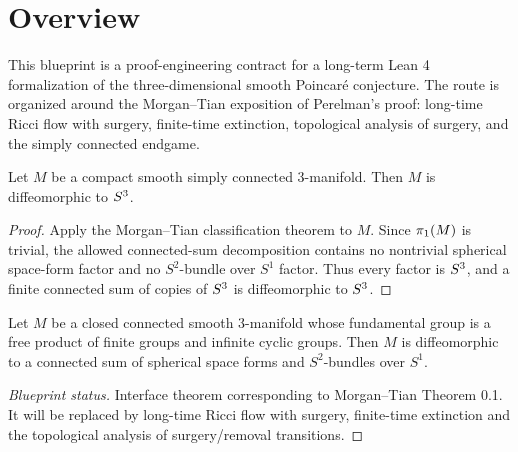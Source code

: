 \chapter{Overview}

This blueprint is a proof-engineering contract for a long-term Lean 4
formalization of the three-dimensional smooth Poincar\'e conjecture. The route is
organized around the Morgan--Tian exposition of Perelman's proof: long-time Ricci
flow with surgery, finite-time extinction, topological analysis of surgery, and
the simply connected endgame.

\begin{theorem}
  \label{thm:poincare-three-smooth}
  \notready
  Let $M$ be a compact smooth simply connected 3-manifold. Then $M$ is
  diffeomorphic to $S^3$.
\end{theorem}

\begin{proof}
  Apply the Morgan--Tian classification theorem to $M$. Since $\pi_1(M)$ is
  trivial, the allowed connected-sum decomposition contains no nontrivial
  spherical space-form factor and no $S^2$-bundle over $S^1$ factor. Thus every
  factor is $S^3$, and a finite connected sum of copies of $S^3$ is
  diffeomorphic to $S^3$.
\end{proof}

\begin{theorem}
  \label{thm:morgan-tian-classification-interface}
  \notready
  Let $M$ be a closed connected smooth 3-manifold whose fundamental group is a
  free product of finite groups and infinite cyclic groups. Then $M$ is
  diffeomorphic to a connected sum of spherical space forms and $S^2$-bundles
  over $S^1$.
\end{theorem}

\begin{proof}[Blueprint status]
  Interface theorem corresponding to Morgan--Tian Theorem 0.1. It will be
  replaced by long-time Ricci flow with surgery, finite-time extinction and the
  topological analysis of surgery/removal transitions.
\end{proof}
